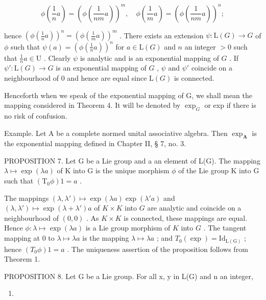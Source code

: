 \[
\phi \left(\frac {1}{n} a\right) = \left(\phi \left(\frac {1}{n m} a\right)\right) ^ {m}, \quad \phi \left(\frac {1}{m} a\right) = \left(\phi \left(\frac {1}{n m} a\right)\right) ^ {n};
\]

hence \(\left(\phi\left(\frac{1}{n}a\right)\right)^n = \left(\phi\left(\frac{1}{m}a\right)\right)^m\) . There exists an extension \(\psi: \mathrm{L}(G) \to G\) of \(\phi\) such that \(\psi(a) = \left(\phi\left(\frac{1}{n}a\right)\right)^n\) for \(a \in \mathrm{L}(G)\) and \(n\) an integer \(>0\) such that \(\frac{1}{n}a \in \mathrm{U}\) . Clearly \(\psi\) is analytic and is an exponential mapping of \(G\) . If \(\psi': \mathrm{L}(G) \to G\) is an exponential mapping of \(G\) , \(\psi\) and \(\psi'\) coincide on a neighbourhood of 0 and hence are equal since \(\mathrm{L}(G)\) is connected.

Henceforth when we speak of the exponential mapping of G, we shall mean the mapping considered in Theorem 4. It will be denoted by \(\exp_{G}\) or exp if there is no risk of confusion.

Example. Let A be a complete normed unital associative algebra. Then \(\exp_{\mathbf{A}}\) is the exponential mapping defined in Chapter II, § 7, no. 3.

PROPOSITION 7. Let G be a Lie group and a an element of L(G). The mapping \(\lambda \mapsto \exp(\lambda a)\) of K into G is the unique morphism \(\phi\) of the Lie group K into G such that \((\mathrm{T}_0\phi)1 = a\) .

The mappings \((\lambda, \lambda') \mapsto \exp(\lambda a) \exp(\lambda' a)\) and \((\lambda, \lambda') \mapsto \exp(\lambda + \lambda') a\) of \(K \times K\) into \(G\) are analytic and coincide on a neighbourhood of \((0, 0)\) . As \(K \times K\) is connected, these mappings are equal. Hence \(\phi: \lambda \mapsto \exp(\lambda a)\) is a Lie group morphism of \(K\) into \(G\) . The tangent mapping at \(0\) to \(\lambda \mapsto \lambda a\) is the mapping \(\lambda \mapsto \lambda a\) ; and \(T_0(\exp) = \mathrm{Id}_{\mathrm{L}(\mathrm{G})}\) ; hence \((T_0\phi)1 = a\) . The uniqueness assertion of the proposition follows from Theorem 1.

PROPOSITION 8. Let G be a Lie group. For all x, y in L(G) and n an integer,

\begin{enumerate}
\def\labelenumi{(\arabic{enumi})}
\setcounter{enumi}{1}
\tightlist
\item
\end{enumerate}

